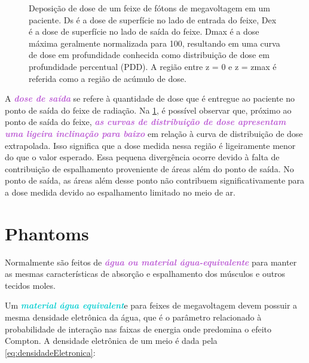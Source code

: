 \documentclass[11pt,a4paper]{article}
\begin{document}
	\begin{figure}[h]
		\centering
		\caption{Deposição de dose de um feixe de fótons de megavoltagem em um paciente. Ds é a dose de superfície no lado de entrada do feixe, Dex é a dose de superfície no lado de saída do feixe. Dmax é a dose máxima geralmente normalizada para 100, resultando em uma curva de dose em profundidade conhecida como distribuição de dose em profundidade percentual (PDD). A região entre z = 0 e z = zmax é referida como a região de acúmulo de dose.}
		\label{fig:pdpSaida}
	\end{figure}

	A \textcolor{MediumOrchid}{\textbf{\textit{dose de saída}}} se refere à quantidade de dose que é entregue ao paciente no ponto de saída do feixe de radiação. Na \ref{fig:pdpSaida}, é possível observar que, próximo ao ponto de saída do feixe, \textcolor{MediumOrchid}{\textbf{\textit{as curvas de distribuição de dose apresentam uma ligeira inclinação para baixo}}} em relação à curva de distribuição de dose extrapolada. Isso significa que a dose medida nessa região é ligeiramente menor do que o valor esperado. Essa pequena divergência ocorre devido à falta de contribuição de espalhamento proveniente de áreas além do ponto de saída. No ponto de saída, as áreas além desse ponto não contribuem significativamente para a dose medida devido ao espalhamento limitado no meio de ar.

\section{Phantoms}

	Normalmente são feitos de \textcolor{MediumOrchid}{\textbf{\textit{água ou material água-equivalente}}} para manter as mesmas características de absorção e espalhamento dos músculos e outros tecidos moles.

	Um \textcolor{DarkTurquoise}{\textbf{\textit{material água equivalent}}}e para feixes de megavoltagem devem possuir a mesma densidade eletrônica da água, que é o parâmetro relacionado à probabilidade de interação nas faixas de energia onde predomina o efeito Compton. A densidade eletrônica de um meio é dada pela \ref{eq:densidadeEletronica}:
\end{document}
